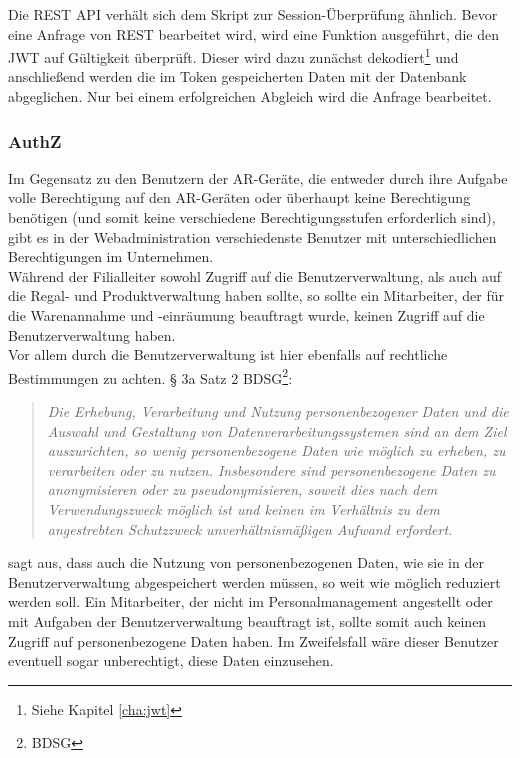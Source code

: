 Die \acs{REST} \acs{API} verhält sich dem Skript zur Session-Überprüfung ähnlich. Bevor eine Anfrage von \acs{REST} bearbeitet wird, wird eine Funktion ausgeführt, die den \acs{JWT} auf Gültigkeit überprüft. Dieser wird dazu zunächst dekodiert\footnote{Siehe Kapitel \ref{cha:jwt} } und anschließend werden die im Token gespeicherten Daten mit der Datenbank abgeglichen. Nur bei einem erfolgreichen Abgleich wird die Anfrage bearbeitet.

\subsubsection{\acf{AuthZ}}
Im Gegensatz zu den Benutzern der \ac{AR}-Geräte, die entweder durch ihre Aufgabe volle Berechtigung auf den \ac{AR}-Geräten oder überhaupt keine Berechtigung benötigen (und somit keine verschiedene Berechtigungsstufen erforderlich sind), gibt es in der Webadministration verschiedenste Benutzer mit unterschiedlichen Berechtigungen im Unternehmen.\\
Während der Filialleiter sowohl Zugriff auf die Benutzerverwaltung, als auch auf die Regal- und Produktverwaltung haben sollte, so sollte ein Mitarbeiter, der für die Warenannahme und -einräumung beauftragt wurde, keinen Zugriff auf die Benutzerverwaltung haben.\\
Vor allem durch die Benutzerverwaltung ist hier ebenfalls auf rechtliche Bestimmungen zu achten. § 3a Satz 2 \acs{BDSG}\footnote{\acf{BDSG}}:
\begin{quote}
	\glqq \textit{Die Erhebung, Verarbeitung und Nutzung personenbezogener Daten und die Auswahl und Gestaltung von Datenverarbeitungssystemen sind an dem Ziel auszurichten, so wenig personenbezogene Daten wie möglich zu erheben, zu verarbeiten oder zu nutzen. Insbesondere sind personenbezogene Daten zu anonymisieren oder zu pseudonymisieren, soweit dies nach dem Verwendungszweck möglich ist und keinen im Verhältnis zu dem angestrebten Schutzzweck unverhältnismäßigen Aufwand erfordert.}\grqq
\end{quote}
sagt aus, dass auch die Nutzung von personenbezogenen Daten, wie sie in der Benutzerverwaltung abgespeichert werden müssen, so weit wie möglich reduziert werden soll. Ein Mitarbeiter, der nicht im Personalmanagement angestellt oder mit Aufgaben der Benutzerverwaltung beauftragt ist, sollte somit auch keinen Zugriff auf personenbezogene Daten haben. Im Zweifelsfall wäre dieser Benutzer eventuell sogar unberechtigt, diese Daten einzusehen.\\


